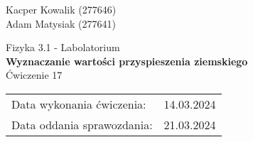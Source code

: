 \begin{flushright}
    Kacper Kowalik (277646) \\
    Adam Matysiak (277641)
\end{flushright}

\vspace{2mm}

\begin{center}
    Fizyka 3.1 - Labolatorium \\
    \vspace{15px}
    {\Large{\textbf{Wyznaczanie wartości przyspieszenia ziemskiego}}} \\
    \vspace{15px}
    Ćwiczenie 17 \\
\end{center}

\begin{flushright}
    \begin{tabular}{lr}
         Data wykonania ćwiczenia:  & 14.03.2024 \\
         Data oddania sprawozdania: & 21.03.2024
    \end{tabular}
\end{flushright}

